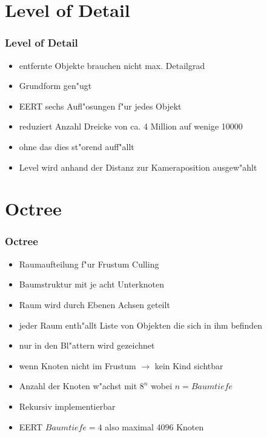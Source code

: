 \documentclass[notes]{beamer} %
\begin{document}
\section{Level of Detail}
\begin{frame}
\begin{spacing}{1}
\frametitle{Level of Detail}
\begin{itemize}
\item entfernte Objekte brauchen nicht max. Detailgrad
\item Grundform gen"ugt
\item EERT sechs Aufl"osungen f"ur jedes Objekt
\item reduziert Anzahl Dreicke von ca. 4 Million auf wenige 10000
\item ohne das dies st"orend auff"allt
\item Level wird anhand der Distanz zur Kameraposition ausgew"ahlt
\end{itemize}
\end{spacing}
\end{frame}
\section{Octree}
\begin{frame}
\begin{spacing}{1}
\frametitle{Octree}
\begin{itemize}
\item Raumaufteilung f"ur Frustum Culling
\item Baumstruktur mit je acht Unterknoten
\item Raum wird durch Ebenen Achsen geteilt
\item jeder Raum enth"allt Liste von Objekten die sich in ihm befinden
\item nur in den Bl"attern wird gezeichnet
\item wenn Knoten nicht im Frustum $\rightarrow$ kein Kind sichtbar
\item Anzahl der Knoten w"achst mit $8^{n}$ wobei $n = Baumtiefe$
\item Rekursiv implementierbar
\item EERT $Baumtiefe = 4$ also maximal 4096 Knoten
\end{itemize}
\end{spacing}
\end{frame}
\end{document}
